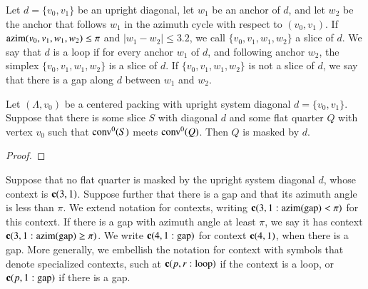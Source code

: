 \begin{definition}
Let $d=\{v_0,v_1\}$ be an upright diagonal, let $w_1$ be an anchor
of $d$, and let $w_2$ be the anchor that follows $w_1$ in the azimuth
cycle with respect to $(v_0,v_1)$.  If ${\operatorname{azim}}(v_0,v_1,w_1,w_2)\le\pi$
and $|w_1-w_2|\le 3.2$, we call $\{v_0,v_1,w_1,w_2\}$ a slice of $d$.
We say that $d$ is a loop if for every anchor $w_1$ of $d$, and
following anchor $w_2$, the simplex $\{v_0,v_1,w_1,w_2\}$ is a slice of $d$.
If $\{v_0,v_1,w_1,w_2\}$ is not a slice of $d$, we say that there
is a gap along $d$ between $w_1$ and $w_2$.
\end{definition}


\begin{lemma}  Let $(\Lambda,v_0)$ be a centered packing with upright
system diagonal $d=\{v_0,v_1\}$.  Suppose that there is some slice
$S$ with diagonal $d$ and some flat quarter $Q$ with vertex $v_0$ such
that ${\operatorname{conv}}^0(S)$ meets ${\operatorname{conv}}^0(Q)$.  Then $Q$ is masked by
$d$.
\end{lemma}

\begin{proof} 
\end{proof}



\begin{definition}
Suppose that no flat quarter
is masked by the upright system diagonal $d$, whose context is
${\operatorname{\bf c}}{(3,1)}$.  Suppose further that there 
is a gap and that its azimuth angle is less than $\pi$.  We extend
notation for contexts, writing
 ${\operatorname{\bf c}}{(3,1: {\operatorname{azim}}({\operatorname{gap}}) <\pi)}$ for this context.  %
If there is a gap with azimuth angle at least $\pi$, we say it
has context ${\operatorname{\bf c}}{(3,1: {\operatorname{azim}}({\operatorname{gap}}) \ge \pi)}$.  %
We write ${\operatorname{\bf c}}{(4,1:{\operatorname{gap}})}$ for context ${\operatorname{\bf c}}{(4,1)}$, when there is
a gap. %
More generally, we embellish the notation for context with symbols that
denote specialized contexts, such at ${\operatorname{\bf c}}{(p,r : {\operatorname{loop}})}$ if
the context is a loop, or ${\operatorname{\bf c}}{(p,1 : {\operatorname{gap}})}$ if there is a gap.
\end{definition}




